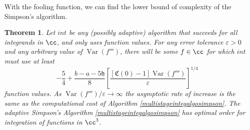 \documentclass[draft]{iitthesis}
\DeclareMathOperator{\Var}{Var}
\newtheorem{theorem}{Theorem}
\theoremstyle{definition}
\theoremstyle{remark}
\begin{document}
With the fooling function, we can find the lower bound of complexity of the Simpson's algorithm.
\begin{theorem}\label{compsim}
    Let $int$ be any (possibly adaptive) algorithm that succeeds for all integrands in $\cc$, and only uses function values. For any error tolerance $\varepsilon > 0$ and any arbitrary value of $\Var(f''')$, there will be some $f\in \cc$ for which $int$ must use at least
    \begin{equation}\label{complowbdsim}
        -\frac{5}{4}+\frac{b-a-5\mathfrak{h}}{8}\left[\frac{[\mathfrak{C}(0)-1]\Var( f''')}{\varepsilon}\right]^{1/4}
    \end{equation}
    function values. As $\Var(f''')/\varepsilon \rightarrow \infty$ the asymptotic rate of increase is the same as the computational cost of Algorithm \ref{multistageintegalgosimpson}. The adaptive Simpson's Algorithm \ref{multistageintegalgosimpson} has optimal order for integration of functions in $\cc^3$.
\end{theorem}
\end{document}

